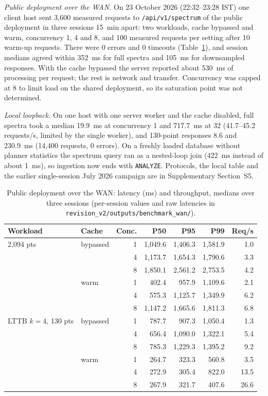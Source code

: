 \documentclass[final,5p,twocolumn,a4paper]{elsarticle}
\begin{document}
\textit{Public deployment over the WAN.} On 23 October 2026 (22:32--23:28 IST) one client host sent 3,600 measured requests to \texttt{/api/v1/spectrum} of the public deployment in three sessions 15~min apart: two workloads, cache bypassed and warm, concurrency 1, 4 and 8, and 100 measured requests per setting after 10 warm-up requests. There were 0 errors and 0 timeouts (Table~\ref{table:wan}), and session medians agreed within 352~ms for full spectra and 105~ms for downsampled responses. With the cache bypassed the server reported about 530~ms of processing per request; the rest is network and transfer. Concurrency was capped at 8 to limit load on the shared deployment, so its saturation point was not determined.

\textit{Local loopback.} On one host with one server worker and the cache disabled, full spectra took a median 19.9~ms at concurrency 1 and 717.7~ms at 32 (41.7--45.2 requests/s, limited by the single worker), and 130-point responses 8.6 and 230.9~ms (14,400 requests, 0 errors). On a freshly loaded database without planner statistics the spectrum query ran as a nested-loop join (422~ms instead of about 1~ms), so ingestion now ends with \texttt{ANALYZE}. Protocols, the local table and the earlier single-session July 2026 campaign are in Supplementary Section~S5.

\begin{table}[!htbp]
\centering
\scriptsize
\setlength{\tabcolsep}{2.5pt}
\begin{tabular}{@{}llrrrrr@{}}
\toprule
\textbf{Workload} & \textbf{Cache} & \textbf{Conc.} & \textbf{P50} & \textbf{P95} & \textbf{P99} & \textbf{Req/s} \\
\midrule
2,094 pts & bypassed & 1 & 1,049.6 & 1,406.3 & 1,581.9 & 1.0 \\
             &          & 4 & 1,173.7 & 1,654.3 & 1,790.6 & 3.3 \\
             &          & 8 & 1,850.1 & 2,561.2 & 2,753.5 & 4.2 \\
             & warm     & 1 & 402.4   & 957.9   & 1,109.6 & 2.1 \\
             &          & 4 & 575.3   & 1,125.7 & 1,349.9 & 6.2 \\
             &          & 8 & 1,147.2 & 1,665.6 & 1,811.3 & 6.8 \\
LTTB $k{=}4$, 130 pts & bypassed & 1 & 787.7 & 907.3   & 1,050.4 & 1.3 \\
             &          & 4 & 656.4   & 1,090.0 & 1,322.1 & 5.4 \\
             &          & 8 & 785.3   & 1,229.3 & 1,395.2 & 9.2 \\
             & warm     & 1 & 264.7   & 323.3   & 560.8   & 3.5 \\
             &          & 4 & 272.9   & 305.4   & 822.0   & 13.5 \\
             &          & 8 & 267.9   & 321.7   & 407.6   & 26.6 \\
\bottomrule
\end{tabular}
\caption{Public deployment over the WAN: latency (ms) and throughput, medians over three sessions (per-session values and raw latencies in \texttt{revision\_v2/outputs/benchmark\_wan/}).}
\label{table:wan}
\end{table}
\end{document}
